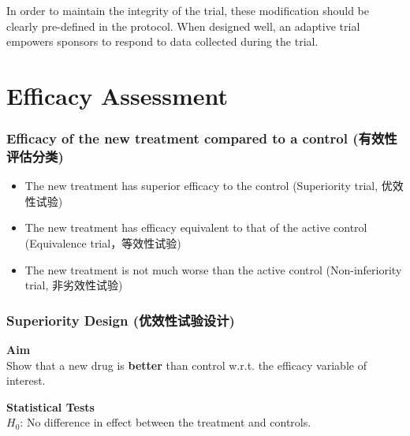 \documentclass[table,10pt]{beamer}
\begin{document}
\begin{CJK*}{UTF8}{gbsn}
\begin{frame}[t]
In order to maintain the integrity of the trial, these modification should be \alert{clearly 
pre-defined} in the protocol. When designed well, an adaptive trial empowers sponsors to respond 
to data collected during the trial.

\end{frame}


\section{Efficacy Assessment}

\begin{frame}[t]
\frametitle{Efficacy of the new treatment compared to a control (有效性评估分类)}
\begin{itemize}
	\item The new treatment has superior efficacy to the control (Superiority trial, 优效性试验)
	\item The new treatment has efficacy equivalent to that of the active control (Equivalence trial，等效性试验)
	\item The new treatment is not much worse than the active control (Non-inferiority trial, 非劣效性试验)
\end{itemize}
\end{frame}



\begin{frame}[t]
\frametitle{Superiority Design (优效性试验设计)}
\textbf{Aim}\\
Show that a new drug is \textbf{better} than control w.r.t. the efficacy variable of interest.

\textbf{Statistical Tests}\\
$H_0$: No difference in effect between the treatment and controls.


\end{frame}
\end{CJK*}
\end{document}
